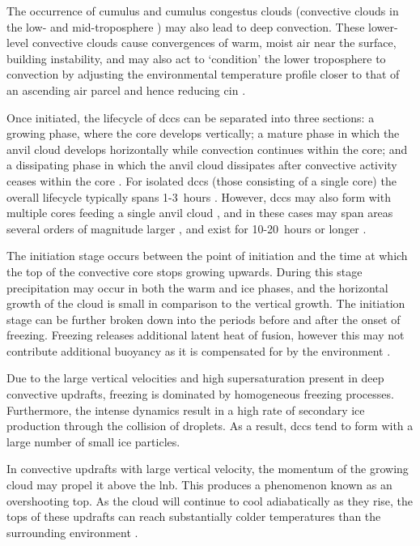 The occurrence of cumulus and cumulus congestus clouds (convective clouds in the low- and mid-troposphere \citep{johnson_trimodal_1999}) may also lead to deep convection. 
These lower-level convective clouds cause convergences of warm, moist air near the surface, building instability, and may also act to `condition’ the lower troposphere to convection by adjusting the environmental temperature profile closer to that of an ascending air parcel and hence reducing \acrshort{cin} \citep{masunaga_mechanism_2014, schulz_observing_2018}.

Once initiated, the lifecycle of \acrshort{dcc}s can be separated into three sections: a growing phase, where the core develops vertically; a mature phase in which the anvil cloud develops horizontally while convection continues within the core; and a dissipating phase in which the anvil cloud dissipates after convective activity ceases within the core \citep{wall_life_2018}.
For isolated \acrshort{dcc}s (those consisting of a single core) the overall lifecycle typically spans 1-3~hours \citep{chen_diurnal_1997}.
However, \acrshort{dcc}s may also form with multiple cores feeding a single anvil cloud \citep{roca_simple_2017}, and in these cases may span areas several orders of magnitude larger \citep{houze_mesoscale_2004}, and exist for 10-20~hours or longer \citep{chen_diurnal_1997}.

The initiation stage occurs between the point of initiation and the time at which the top of the convective core stops growing upwards.
During this stage precipitation may occur in both the warm and ice phases, and the horizontal growth of the cloud is small in comparison to the vertical growth.
The initiation stage can be further broken down into the periods before and after the onset of freezing.
Freezing releases additional latent heat of fusion, however this may not contribute additional buoyancy as it is compensated for by the environment \citep{seeley_tropical_2016}.

Due to the large vertical velocities and high supersaturation present in deep convective updrafts, freezing is dominated by homogeneous freezing processes.
Furthermore, the intense dynamics result in a high rate of secondary ice production through the collision of droplets.
As a result, \acrshort{dcc}s tend to form with a large number of small ice particles.

In convective updrafts with large vertical velocity, the momentum of the growing cloud may propel it above the \acrshort{lnb}.
This produces a phenomenon known as an overshooting top.
As the cloud will continue to cool adiabatically as they rise, the tops of these updrafts can reach substantially colder temperatures than the surrounding environment \citep{proud_recordlow_2021}.

